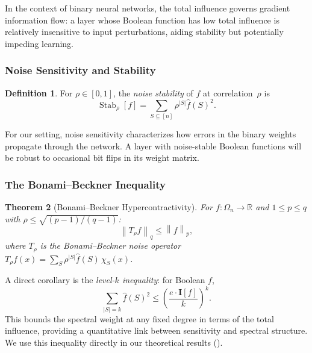 \documentclass[12pt,a4paper]{article}
\theoremstyle{plain}
\newtheorem{theorem}{Theorem}[section]
\theoremstyle{definition}
\newtheorem{definition}[theorem]{Definition}
\theoremstyle{remark}
\newcommand{\R}{\mathbb{R}}
\newcommand{\fhat}{\widehat{f}}
\newcommand{\Stab}{\operatorname{Stab}}
\newcommand{\norm}[1]{\left\| #1 \right\|}
\begin{document}
In the context of binary neural networks, the total influence governs gradient information flow: a layer whose Boolean function has low total influence is relatively insensitive to input perturbations, aiding stability but potentially impeding learning.

\subsubsection{Noise Sensitivity and Stability}

\begin{definition}\label{def:noise-stability}
For $\rho \in [0,1]$, the \emph{noise stability} of $f$ at correlation~$\rho$ is
\begin{equation}\label{eq:noise-stability}
    \Stab_\rho[f] = \sum_{S \subseteq [n]} \rho^{|S|} \fhat(S)^2.
\end{equation}
\end{definition}

For our setting, noise sensitivity characterizes how errors in the binary weights propagate through the network. A layer with noise-stable Boolean functions will be robust to occasional bit flips in its weight matrix.

\subsubsection{The Bonami--Beckner Inequality}

\begin{theorem}[Bonami--Beckner Hypercontractivity]\label{thm:bonami-beckner}
For $f \colon \Omega_n \to \R$ and $1 \leq p \leq q$ with $\rho \leq \sqrt{(p-1)/(q-1)}$:
\begin{equation}\label{eq:bonami-beckner}
    \norm{T_\rho f}_q \leq \norm{f}_p,
\end{equation}
where $T_\rho$ is the Bonami--Beckner noise operator $T_\rho f(x) = \sum_{S} \rho^{|S|} \fhat(S)\, \chi_S(x)$.
\end{theorem}

A direct corollary is the \emph{level-$k$ inequality}: for Boolean $f$,
\begin{equation}\label{eq:level-k}
    \sum_{|S|=k} \fhat(S)^2 \leq \left(\frac{e \cdot \mathbf{I}[f]}{k}\right)^k.
\end{equation}
This bounds the spectral weight at any fixed degree in terms of the total influence, providing a quantitative link between sensitivity and spectral structure. We use this inequality directly in our theoretical results ().
\end{document}
